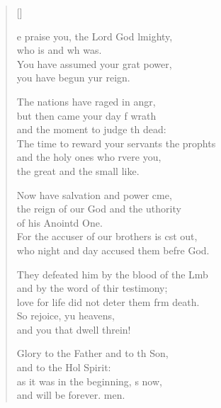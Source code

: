 \settowidth{\versewidth}{The time to reward your servants the prophets +}
\begin{verse}[\versewidth]
  \begin{patverse}
e praise you, the Lord God lmighty,\Med\\
who is and wh was.\\
You have assumed your grat power,\Med\\
you have begun yur reign.

The nations have raged in angr,\Flex\\
but then came your day f wrath\Med\\
and the moment to judge th dead:\\
The time to reward your servants the prophts\Flex\\
and the holy ones who rvere you,\Med\\
the great and the small like.

Now have salvation and power cme,\Flex\\
the reign of our God and the uthority\Med\\
of his Anointd One.\\
For the accuser of our brothers is cst out,\Med\\
who night and day accused them befre God.

They defeated him by the blood of the Lmb\Flex\\
and by the word of thir testimony;\Med\\
love for life did not deter them frm death.\\
So rejoice, yu heavens,\Med\\
and you that dwell threin!

Glory to the Father and to th Son,\Med\\
and to the Hol Spirit:\\
as it was in the beginning, s now,\Med\\
and will be forever. men. 
  \end{patverse}
\end{verse}
